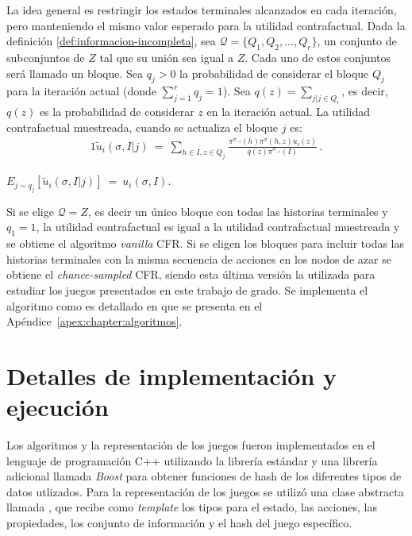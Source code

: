 La idea general es restringir los estados terminales alcanzados en cada iteración, pero manteniendo el mismo valor esperado para la utilidad contrafactual. Dada la definición \ref{def:informacion-incompleta}, sea $\mathcal{Q} = \{Q_1, Q_2, ..., Q_r\}$, un conjunto de subconjuntos de $Z$ tal que su unión sea igual a $Z$. Cada uno de estos conjuntos será llamado un bloque. Sea $q_j > 0$ la probabilidad de considerar el bloque $Q_j$ para la iteración actual (donde $\sum_{j = 1}^r {q_j} = 1$). 
Sea $q(z) = \sum_{j | j \in Q_i}$, es decir, $q(z)$ es la probabilidad de considerar $z$ en la iteración actual. La utilidad contrafactual muestreada, cuando se actualiza el bloque $j$ es:
\begin{alignat}{1}
\tilde{u}_i(\sigma, I | j)\ =\ \sum_{h \in I, z \in Q_j} \frac{\pi^{\sigma_{-i}}(h) \pi^{\sigma}(h, z) u_i(z)}{q(z) \pi^{\sigma_{-i}}(I)} \,.
\end{alignat}

\begin{theorem}
\label{theo:esperanza-MCCFR}
$E_{j \sim q_j} [\tilde{u}_i(\sigma, I | j)]\ =\ u_i(\sigma, I)$.
\end{theorem}

Si se elige $\mathcal{Q} = {Z}$, es decir un único bloque con todas las historias terminales y $q_1 = 1$, la utilidad contrafactual es igual a la utilidad contrafactual muestreada y se obtiene el algoritmo \textit{vanilla} CFR. Si se eligen los bloques para incluir todas las historias terminales con la misma secuencia de acciones en los nodos de azar se obtiene el \textit{chance-sampled} CFR, siendo esta última versión la utilizada para estudiar los juegos presentados en este trabajo de grado. Se implementa el algoritmo como es detallado en \cite{bib:introductionCFR} que se presenta en el Apéndice~\ref{apex:chapter:algoritmos}.



\section{Detalles de implementación y ejecución}

Los algoritmos y la representación de los juegos fueron implementados en el lenguaje de programación C++ utilizando la librería estándar y una librería adicional llamada \textit{Boost} \cite{bib:boost} para obtener funciones de hash de los diferentes tipos de datos utlizados. Para la representación de los juegos se utilizó una clase abstracta llamada , que recibe como \textit{template} los tipos para el estado, las acciones, las propiedades, los conjunto de información y el hash del juego específico.


